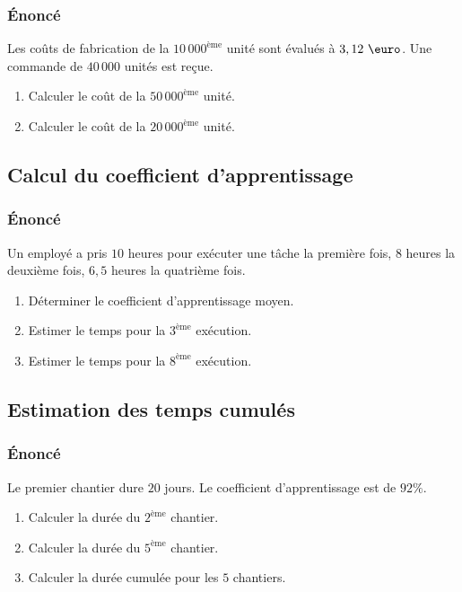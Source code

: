 \documentclass[a4paper,12pt]{article}
\begin{document}
\subsubsection*{Énoncé}

Les coûts de fabrication de la $10\,000^{\text{ème}}$ unité sont évalués à $3,12\ \text{\euro}$. Une commande de $40\,000$ unités est reçue.

\begin{enumerate}
    \item Calculer le coût de la $50\,000^{\text{ème}}$ unité.
    \item Calculer le coût de la $20\,000^{\text{ème}}$ unité.
\end{enumerate}

\subsection{Calcul du coefficient d'apprentissage}

\subsubsection*{Énoncé}

Un employé a pris $10$ heures pour exécuter une tâche la première fois, $8$ heures la deuxième fois, $6,5$ heures la quatrième fois.

\begin{enumerate}
    \item Déterminer le coefficient d'apprentissage moyen.
    \item Estimer le temps pour la $3^{\text{ème}}$ exécution.
    \item Estimer le temps pour la $8^{\text{ème}}$ exécution.
\end{enumerate}

\subsection{Estimation des temps cumulés}

\subsubsection*{Énoncé}

Le premier chantier dure $20$ jours. Le coefficient d'apprentissage est de $92\%$.

\begin{enumerate}
    \item Calculer la durée du $2^{\text{ème}}$ chantier.
    \item Calculer la durée du $5^{\text{ème}}$ chantier.
    \item Calculer la durée cumulée pour les $5$ chantiers.
\end{enumerate}
\end{document}
